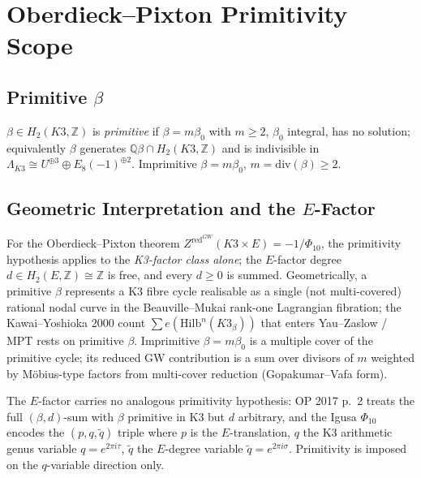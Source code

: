 
\providecommand{\kBKM}{\kappa_{\mathrm{BKM}}}
\providecommand{\kch}{\kappa_{\mathrm{ch}}}
\providecommand{\kcat}{\kappa_{\mathrm{cat}}}
\providecommand{\kfib}{\kappa_{\mathrm{fiber}}}
\providecommand{\Zred}{Z^{\mathrm{red}}}
\providecommand{\cN}{\mathcal{N}}
\providecommand{\ZZ}{\mathbb{Z}}
\providecommand{\QQ}{\mathbb{Q}}
\providecommand{\fg}{\mathfrak{g}}
\providecommand{\Phiten}{\Phi_{10}}
\section*{Oberdieck--Pixton Primitivity Scope}
\label{sec:op-primitive-scope}

\subsection*{Primitive $\beta$}

$\beta \in H_2(K3,\ZZ)$ is \emph{primitive} if $\beta = m\beta_0$ with
$m \ge 2$, $\beta_0$ integral, has no solution; equivalently $\beta$
generates $\QQ\beta\cap H_2(K3,\ZZ)$ and is indivisible in
$\Lambda_{K3}\cong U^{\oplus 3}\oplus E_8(-1)^{\oplus 2}$.  Imprimitive
$\beta = m\beta_0$, $m = \mathrm{div}(\beta) \ge 2$.

\subsection*{Geometric Interpretation and the $E$-Factor}

For the Oberdieck--Pixton theorem $\Zred^{GW}(K3\times E) = -1/\Phiten$,
the primitivity hypothesis applies to the \emph{K3-factor class alone};
the $E$-factor degree $d \in H_2(E,\ZZ)\cong\ZZ$ is free, and every
$d \ge 0$ is summed.  Geometrically, a primitive $\beta$ represents a
K3 fibre cycle realisable as a single (not multi-covered) rational nodal
curve in the Beauville--Mukai rank-one Lagrangian fibration; the
Kawai--Yoshioka 2000 count $\sum e(\mathrm{Hilb}^n(K3_\beta))$ that
enters Yau--Zaslow / MPT rests on primitive $\beta$.  Imprimitive
$\beta = m\beta_0$ is a multiple cover of the primitive cycle; its
reduced GW contribution is a sum over divisors of $m$ weighted by
Möbius-type factors from multi-cover reduction (Gopakumar--Vafa form).

The $E$-factor carries no analogous primitivity hypothesis: OP 2017
p.~2 treats the full $(\beta, d)$-sum with $\beta$ primitive in K3 but
$d$ arbitrary, and the Igusa $\Phiten$ encodes the $(p,q,\tilde q)$
triple where $p$ is the $E$-translation, $q$ the K3 arithmetic
genus variable $q = e^{2\pi i\tau}$, $\tilde q$ the $E$-degree variable
$\tilde q = e^{2\pi i\sigma}$.  Primitivity is imposed on the $q$-variable
direction only.

